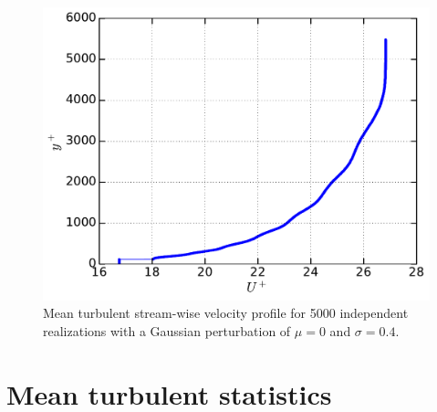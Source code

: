 \documentclass[aps,reprint,amsmath,amssymb,prl]{revtex4-1}%
\begin{document}
\begin{figure}[b]
\includegraphics[scale=0.46]{figures/Master_averaged_step_profile_5000_assembles}
\caption{\label{fig:mean_profile} Mean turbulent stream-wise velocity profile for 5000 independent realizations with a Gaussian perturbation of $\mu=0$ and $\sigma=0.4$.}
\end{figure} 
\section{Mean turbulent statistics}
\end{document}
